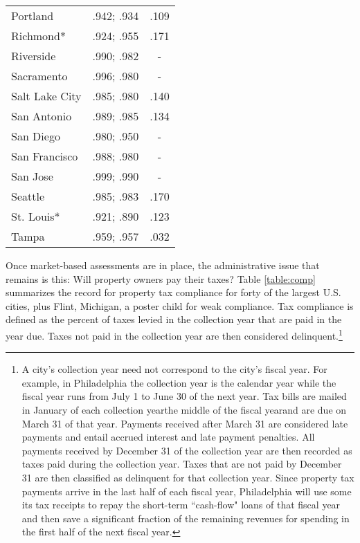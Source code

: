 \documentclass[12pt,titlepage]{article}
\begin{document}
\begin{center}
\begin{longtable}{| l | c |  c|}
Portland	 & .942;  .934	 & .109 \\
Richmond*	 & .924;  .955	 & .171 \\
Riverside	 & .990;  .982	 & - \\
Sacramento	 & .996;  .980	 & - \\
Salt Lake City	 & .985;  .980	 & .140 \\
San Antonio	 & .989;  .985	 & .134 \\
San Diego	 & .980;  .950	 & - \\
San Francisco	 & .988;  .980	 & - \\
San Jose	 & .999;  .990	 & - \\
Seattle	         & .985;  .983	 & .170 \\
St.  Louis*	 & .921;  .890	 & .123 \\
Tampa	         & .959;  .957	 & .032 \\
\end{longtable}
\end{center}

Once market-based assessments are in place, the administrative issue
that remains is this: Will property owners pay their taxes?  Table
\ref{table:comp} summarizes the record for property tax compliance for
forty of the largest U.S. cities, plus Flint, Michigan, a poster child
for weak compliance.  Tax compliance is defined as the percent of
taxes levied in the collection year that are paid in the year due.
Taxes not paid in the collection year are then considered
delinquent.\footnote{A city's collection year need not correspond to
  the city's fiscal year.  For example, in Philadelphia the collection
  year is the calendar year while the fiscal year runs from July 1 to
  June 30 of the next year.  Tax bills are mailed in January of each
  collection year\textemdash the middle of the fiscal year\textemdash and are due on
  March 31 of that year.  Payments received after March 31 are
  considered late payments and entail accrued interest and late payment
  penalties.  All payments received by December 31 of the collection
  year are then recorded as taxes paid during the collection year.
  Taxes that are not paid by December 31 are then classified as
  delinquent for that collection year.  Since property tax payments
  arrive in the last half of each fiscal year, Philadelphia will use
  some its tax receipts to repay the short-term ``cash-flow" loans of
  that fiscal year and then save a significant fraction of the
  remaining revenues for spending in the first half of the next fiscal
  year.}
\end{document}
